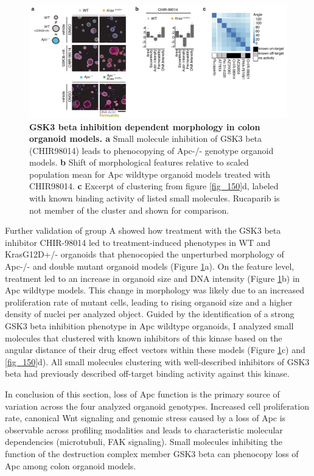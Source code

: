 \begin{flushleft}
\begin{figure}[h]
\centering
\includegraphics[scale=0.75,
                keepaspectratio]{figures/adenomaprofiling/pdf/fig_2_4.pdf}
\caption{\textbf{GSK3 beta inhibition dependent morphology in colon organoid models. a} Small molecule inhibition of GSK3 beta (CHIR98014) leads to phenocopying of Apc-/- genotype organoid models. \textbf{b} Shift of morphological features relative to scaled population mean for Apc wildtype organoid models treated with CHIR98014. \textbf{c} Excerpt of clustering from figure \ref{fig_150}d, labeled with known binding activity of listed small molecules. Rucaparib is not member of the cluster and shown for comparison.}
\label{fig_185}
\end{figure}
\bigbreak

Further validation of group A showed how treatment with the GSK3 beta inhibitor CHIR-98014 led to treatment-induced phenotypes in WT and KrasG12D+/- organoids that phenocopied the unperturbed morphology of Apc-/- and double mutant organoid models (Figure \ref{fig_185}a). On the feature level, treatment led to an increase in organoid size and DNA intensity (Figure \ref{fig_185}b) in Apc wildtype models. This change in morphology was likely due to an increased proliferation rate of mutant cells, leading to rising organoid size and a higher density of nuclei per analyzed object. Guided by the identification of a strong GSK3 beta inhibition phenotype in Apc wildtype organoids, I analyzed small molecules that clustered with known inhibitors of this kinase based on the angular distance of their drug effect vectors within these models (Figure \ref{fig_185}c) and \ref{fig_150}d). All small molecules clustering with well-described inhibitors of GSK3 beta had previously described off-target binding activity against this kinase.  

\bigbreak

In conclusion of this section, loss of Apc function is the primary source of variation across the four analyzed organoid genotypes. Increased cell proliferation rate, canonical Wnt signaling and genomic stress caused by a loss of Apc is observable across profiling modalities and leads to characteristic molecular dependencies (microtubuli, FAK signaling). Small molecules inhibiting the function of the destruction complex member GSK3 beta can phenocopy loss of Apc among colon organoid models.   


\end{flushleft}
